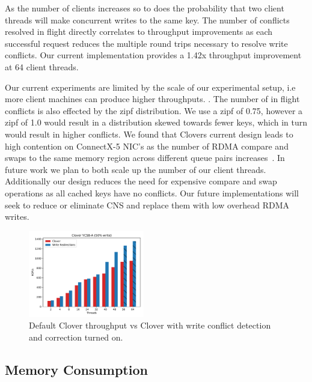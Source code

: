 As the number of clients increases so to does the probability that two
client threads will make concurrent writes to the same key. The number
of conflicts resolved in flight directly correlates to throughput
improvements as each successful request reduces the multiple round
trips necessary to resolve write conflicts. Our current implementation
provides a 1.42x throughput improvement at 64 client threads.

Our current experiments are limited by the scale of our experimental
setup, i.e more client machines can produce higher throughputs.
. 
The number of in flight conflicts is also effected by the zipf
distribution. We use a zipf of 0.75, however a zipf of 1.0 would
result in a distribution skewed towards fewer keys, which in turn
would result in higher conflicts. We found that Clovers current design
leads to high contention on ConnectX-5 NIC's as the number of RDMA
compare and swaps to the same memory region across different queue
pairs increases~\cite{design-guidelines}. In future work we plan to
both scale up the number of our client threads. Additionally our
design reduces the need for expensive compare and swap operations as
all cached keys have no conflicts. Our future implementations will
seek to reduce or eliminate CNS and replace them with low overhead
RDMA writes.

\begin{figure}
    \includegraphics[width=0.45\textwidth]{fig/throughput.pdf}
    \caption{Default Clover throughput vs Clover with write conflict
    detection and correction turned on.}
    \label{fig:conflicts}
\end{figure}

\subsection{Memory Consumption}

